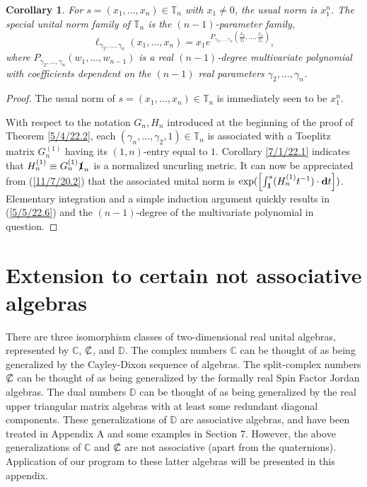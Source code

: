 \documentclass{amsart}
\newtheorem{corollary}[theorem]{Corollary}
\theoremstyle{definition}
\numberwithin{theorem}{section}
\numberwithin{equation}{section}
\begin{document}
\begin{corollary}\label{5/17/22.1} For $s= (x_1,\dots,x_n)\in \mathbb{T}_n$ with $x_1\ne 0$, the usual norm is $x_1^n$.  The special unital norm family of $\mathbb{T}_n$ is the $(n-1)$-parameter family,
\begin{equation} \label{5/5/22.6} \ell_{\gamma_2,\dots,\gamma_n}(x_1,\dots,x_n) = x_1 e^{P_{\gamma_2,\dots,\gamma_n}\left(\frac{x_2}{x_1},\dots,\frac{x_n}{x_1}\right)},\end{equation} where $P_{\gamma_2,\dots,\gamma_n}(w_1,\dots,w_{n-1})$ is a real $(n-1)$-degree multivariate polynomial with coefficients dependent on the $(n-1)$ real parameters $\gamma_2,\dots,\gamma_n$.    \end{corollary}

\begin{proof} The usual norm of $s=(x_1,\dots,x_n)\in \mathbb{T}_n$ is immediately seen to be $x_1^n$.

\enlargethispage{1cm}
With respect to the notation $G_n,H_n$ introduced at the beginning of the proof of Theorem \ref{5/4/22.2}, each $(\gamma_n,\dots,\gamma_2,1)\in\mathbb{T}_n$ is associated with a Toeplitz matrix $G_n^{(1)}$ having its $(1,n)$-entry equal to $1$.  Corollary \ref{7/1/22.1} indicates that $H^{(1)}_n\equiv G_n^{(1)}\slashed{\bf 1}_n$ is a normalized uncurling metric. It can now be appreciated from (\ref{11/7/20.2}) that  the associated unital norm is $\text{exp}(\left[\int_{\bf 1}^s (H_n^{(1)} t^{-1})\cdot \mathbf{d}t\right])$.  Elementary integration and a simple induction argument quickly results in (\ref{5/5/22.6}) and the $(n-1)$-degree of the multivariate polynomial in question.
\end{proof}

\vspace{.75cm}

  \section{Extension to certain not associative algebras}
There are three isomorphism classes of two-dimensional real unital algebras, represented by $\mathbb{C}$, $\slashed{\mathbb{C}}$, and $\mathbb{D}$.  The complex numbers $\mathbb{C}$ can be thought of as being generalized by the Cayley-Dixon sequence of algebras.  The split-complex numbers $\slashed{\mathbb{C}}$ can be thought of as being generalized by the formally real Spin Factor Jordan algebras.  The dual numbers $\mathbb{D}$ can be thought of as being generalized by the real upper triangular matrix algebras with at least some redundant diagonal components.  These generalizations of $\mathbb{D}$ are associative algebras, and have been treated in Appendix A and some examples in Section 7.  However, the above generalizations of $\mathbb{C}$ and $\slashed{\mathbb{C}}$ are not associative (apart from the quaternions).  Application of our program to these latter algebras will be presented in this appendix. 
\end{document}
